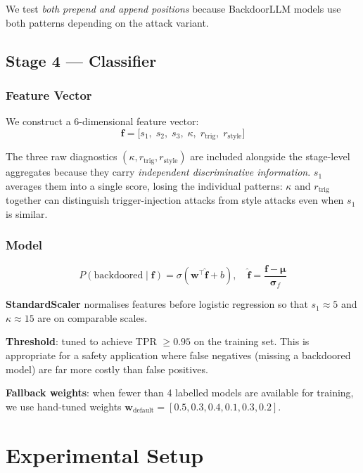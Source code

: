 \documentclass[11pt,a4paper]{article}
\begin{document}
We test \emph{both prepend and append positions} because BackdoorLLM models use
both patterns depending on the attack variant.

\subsection{Stage 4 --- Classifier}
\label{sec:stage4}

\subsubsection{Feature Vector}

We construct a 6-dimensional feature vector:
\[
  \mathbf{f} = \bigl[s_1,\; s_2,\; s_3,\; \kappa,\; r_\text{trig},\; r_\text{style}\bigr]
\]

The three raw diagnostics $(\kappa, r_\text{trig}, r_\text{style})$ are included
alongside the stage-level aggregates because they carry \emph{independent
discriminative information}. $s_1$ averages them into a single score, losing the
individual patterns: $\kappa$ and $r_\text{trig}$ together can distinguish
trigger-injection attacks from style attacks even when $s_1$ is similar.

\subsubsection{Model}

\[
  P(\text{backdoored} \mid \mathbf{f})
  = \sigma\!\left(\mathbf{w}^\top \hat{\mathbf{f}} + b\right), \quad
  \hat{\mathbf{f}} = \frac{\mathbf{f} - \boldsymbol{\mu}}{\boldsymbol{\sigma}_f}
\]

\textbf{StandardScaler} normalises features before logistic regression so that
$s_1 \approx 5$ and $\kappa \approx 15$ are on comparable scales.

\textbf{Threshold}: tuned to achieve TPR $\geq 0.95$ on the training set.
This is appropriate for a safety application where false negatives (missing a
backdoored model) are far more costly than false positives.

\textbf{Fallback weights}: when fewer than 4 labelled models are available for
training, we use hand-tuned weights $\mathbf{w}_\text{default} = [0.5, 0.3, 0.4, 0.1, 0.3, 0.2]$.

\section{Experimental Setup}
\end{document}
